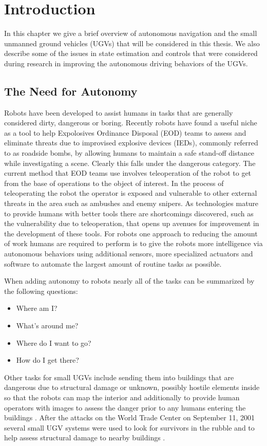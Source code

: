\chapter{Introduction}
\label{ch:introduction}
In this chapter we give a brief overview of autonomous navigation and the small unmanned ground vehicles (UGVs) that will be considered in this thesis. We also describe some of the issues in state estimation and controls that were considered during research in improving the autonomous driving behaviors of the UGVs.

\section{The Need for Autonomy}
\label{sec:needforautonomy}
Robots have been developed to assist humans in tasks that are generally considered dirty, dangerous or boring. Recently robots have found a useful niche as a tool to help Expolosives Ordinance Disposal (EOD) teams to assess and eliminate threats due to improvised explosive devices (IEDs), commonly referred to as roadside bombs, by allowing humans to maintain a safe stand-off distance while investigating a scene. Clearly this falls under the dangerous category. The current method that EOD teams use involves teleoperation of the robot to get from the base of operations to the object of interest. In the process of teleoperating the robot the operator is exposed and vulnerable to other external threats in the area such as ambushes and enemy snipers. As technologies mature to provide humans with better tools there are shortcomings discovered, such as the vulnerability due to teleoperation, that opens up avenues for improvement in the development of these tools. For robots one approach to reducing the amount of work humans are required to perform is to give the robots more intelligence via autonomous behaviors using additional sensors, more specialized actuators and software to automate the largest amount of routine tasks as possible.

When adding autonomy to robots nearly all of the tasks can be summarized by the following questions:
\begin{itemize}
\item Where am I?
\item What's around me?
\item Where do I want to go?
\item How do I get there?
\end{itemize}

Other tasks for small UGVs include sending them into buildings that are dangerous due to structural damage or unknown, possibly hostile elements inside so that the robots can map the interior and additionally to provide human operators with images to assess the danger prior to any humans entering the buildings \cite{CongressUGV06}. After the attacks on the World Trade Center on September 11, 2001 several small UGV systems were used to look for survivors in the rubble and to help assess structural damage to nearby buildings \cite{Everett02}.

